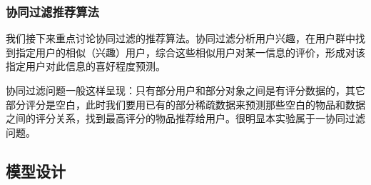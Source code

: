 \subsubsection{协同过滤推荐算法}
\xiaosi\begin{spacing}{1.5}
我们接下来重点讨论协同过滤的推荐算法。协同过滤分析用户兴趣，在用户群中找到指定用户的相似（兴趣）用户，综合这些相似用户对某一信息的评价，形成对该指定用户对此信息的喜好程度预测。\par
协同过滤问题一般这样呈现：只有部分用户和部分对象之间是有评分数据的，其它部分评分是空白，此时我们要用已有的部分稀疏数据来预测那些空白的物品和数据之间的评分关系，找到最高评分的物品推荐给用户。很明显本实验属于一协同过滤问题。
\end{spacing}

\subsection{模型设计}
